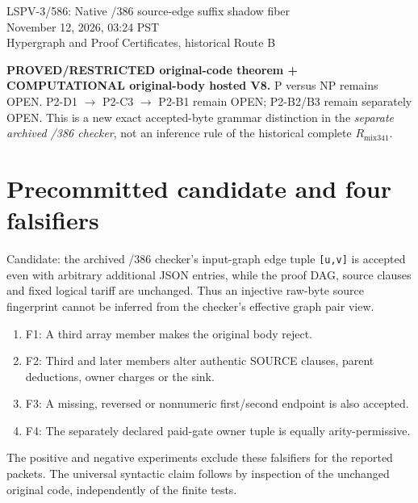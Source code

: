\documentclass[11pt]{article}
\begin{document}
\begin{center}
{\Large LSPV-3/586: Native /386 source-edge suffix shadow fiber}\\[4pt]
November 12, 2026, 03:24 PST\\
Hypergraph and Proof Certificates, historical Route B
\end{center}
\noindent\textbf{PROVED/RESTRICTED original-code theorem + COMPUTATIONAL original-body hosted V8.}
P versus NP remains OPEN. P2-D1 $\to$ P2-C3 $\to$ P2-B1 remain OPEN; P2-B2/B3 remain separately OPEN. This is a new exact accepted-byte grammar distinction in the \emph{separate archived /386 checker}, not an inference rule of the historical complete $R_{\mathrm{mix341}}$.

\section*{Precommitted candidate and four falsifiers}
Candidate: the archived /386 checker's input-graph edge tuple \texttt{[u,v]} is accepted even with arbitrary additional JSON entries, while the proof DAG, source clauses and fixed logical tariff are unchanged. Thus an injective raw-byte source fingerprint cannot be inferred from the checker's effective graph pair view.
\begin{enumerate}
\item[] F1: A third array member makes the original body reject.
\item[] F2: Third and later members alter authentic SOURCE clauses, parent deductions, owner charges or the sink.
\item[] F3: A missing, reversed or nonnumeric first/second endpoint is also accepted.
\item[] F4: The separately declared paid-gate owner tuple is equally arity-permissive.
\end{enumerate}
The positive and negative experiments exclude these falsifiers for the reported packets. The universal syntactic claim follows by inspection of the unchanged original code, independently of the finite tests.
\end{document}
